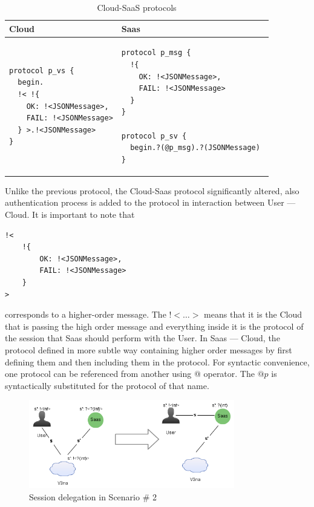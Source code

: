 {
\lstset{
framerule=0pt,
numbers=none
}
\begin{longtable}{|p{}|p{}|}
\caption{Cloud-SaaS protocols}\label{tab:cloud-saas-providers} \\ \hline
\textbf{Cloud} & \textbf{Saas} \\ \hline \endhead
\begin{lstlisting}
protocol p_vs {
  begin.
  !< !{
    OK: !<JSONMessage>, 
    FAIL: !<JSONMessage>
  } >.!<JSONMessage>    
}
\end{lstlisting}
&
\begin{lstlisting}
protocol p_msg { 
  !{
    OK: !<JSONMessage>,
    FAIL: !<JSONMessage> 
  }
}

protocol p_sv {
  begin.?(@p_msg).?(JSONMessage) 
}
\end{lstlisting}
\\ \hline
\end{longtable}
}

Unlike the previous protocol, the Cloud-Saas protocol significantly altered, also authentication process is added to the protocol in interaction between User --- Cloud. It is important to note that 

\begin{lstlisting}
!<
    !{
        OK: !<JSONMessage>,
        FAIL: !<JSONMessage> 
    }
>
\end{lstlisting}
corresponds to a higher-order message. The !$<\dots>$ means that it is the Cloud that is passing the high order message and everything inside it is the protocol of the session that Saas should perform with the User. In Saas --- Cloud, the protocol defined in more subtle way containing higher order messages by first defining them and then including them in the protocol. For syntactic convenience, one protocol can be referenced from another using @ operator. The $@p$ is syntactically substituted for the protocol of that name.

\begin{figure}
\centering
\includegraphics[width=0.8\textwidth]{resources/sj-delegation.png}
\caption{Session delegation in Scenario \# 2}
\label{fig:session-delegation-sc2}
\end{figure}


